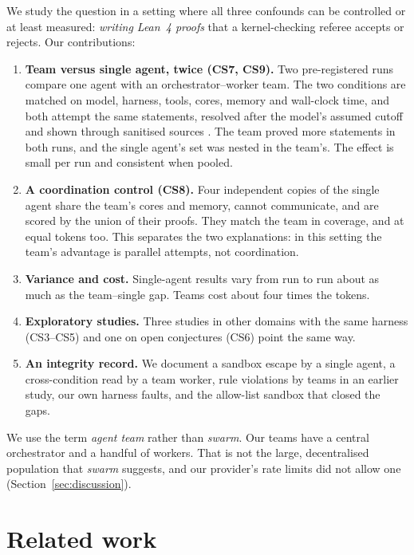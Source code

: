 \documentclass[11pt]{article}
\begin{document}
We study the question in a setting where all three confounds can be controlled or at least measured: \emph{writing Lean~4
proofs} \citep{demoura2021lean4,mathlib2020} that a kernel-checking referee accepts or rejects. Our contributions:
\begin{enumerate}
  \item \textbf{Team versus single agent, twice (CS7, CS9).} Two pre-registered runs compare one agent with an
    orchestrator--worker team. The two conditions are matched on model, harness, tools, cores, memory and wall-clock
    time, and both attempt the same \CSsevenN{} statements, resolved after the model's assumed cutoff and shown through
    sanitised sources \citep{nosek2018}. The team proved more statements in both runs, and the single agent's set was
    nested in the team's. The effect is small per run and consistent when pooled.
  \item \textbf{A coordination control (CS8).} Four independent copies of the single agent share the team's cores and
    memory, cannot communicate, and are scored by the union of their proofs. They match the team in coverage, and at
    equal tokens too. This separates the two explanations: in this setting the team's advantage is parallel attempts,
    not coordination.
  \item \textbf{Variance and cost.} Single-agent results vary from run to run about as much as the team--single gap.
    Teams cost about four times the tokens.
  \item \textbf{Exploratory studies.} Three studies in other domains with the same harness (CS3--CS5) and one on open
    conjectures (CS6) point the same way.
  \item \textbf{An integrity record.} We document a sandbox escape by a single agent, a cross-condition read by a team
    worker, rule violations by teams in an earlier study, our own harness faults, and the allow-list sandbox that closed
    the gaps.
\end{enumerate}
We use the term \emph{agent team} rather than \emph{swarm}. Our teams have a central orchestrator and a handful of
workers. That is not the large, decentralised population that \emph{swarm} suggests, and our provider's rate limits
did not allow one (Section~\ref{sec:discussion}).

\section{Related work}
\end{document}
